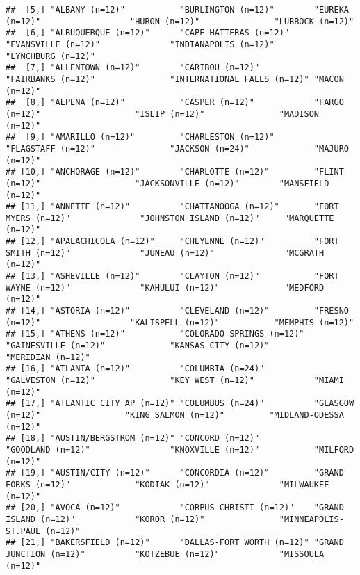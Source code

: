 \documentclass[
]{book}
\begin{document}
\begin{verbatim}
##  [5,] "ALBANY (n=12)"           "BURLINGTON (n=12)"        "EUREKA (n=12)"                  "HURON (n=12)"               "LUBBOCK (n=12)"                
##  [6,] "ALBUQUERQUE (n=12)"      "CAPE HATTERAS (n=12)"     "EVANSVILLE (n=12)"              "INDIANAPOLIS (n=12)"        "LYNCHBURG (n=12)"              
##  [7,] "ALLENTOWN (n=12)"        "CARIBOU (n=12)"           "FAIRBANKS (n=12)"               "INTERNATIONAL FALLS (n=12)" "MACON (n=12)"                  
##  [8,] "ALPENA (n=12)"           "CASPER (n=12)"            "FARGO (n=12)"                   "ISLIP (n=12)"               "MADISON (n=12)"                
##  [9,] "AMARILLO (n=12)"         "CHARLESTON (n=12)"        "FLAGSTAFF (n=12)"               "JACKSON (n=24)"             "MAJURO (n=12)"                 
## [10,] "ANCHORAGE (n=12)"        "CHARLOTTE (n=12)"         "FLINT (n=12)"                   "JACKSONVILLE (n=12)"        "MANSFIELD (n=12)"              
## [11,] "ANNETTE (n=12)"          "CHATTANOOGA (n=12)"       "FORT MYERS (n=12)"              "JOHNSTON ISLAND (n=12)"     "MARQUETTE (n=12)"              
## [12,] "APALACHICOLA (n=12)"     "CHEYENNE (n=12)"          "FORT SMITH (n=12)"              "JUNEAU (n=12)"              "MCGRATH (n=12)"                
## [13,] "ASHEVILLE (n=12)"        "CLAYTON (n=12)"           "FORT WAYNE (n=12)"              "KAHULUI (n=12)"             "MEDFORD (n=12)"                
## [14,] "ASTORIA (n=12)"          "CLEVELAND (n=12)"         "FRESNO (n=12)"                  "KALISPELL (n=12)"           "MEMPHIS (n=12)"                
## [15,] "ATHENS (n=12)"           "COLORADO SPRINGS (n=12)"  "GAINESVILLE (n=12)"             "KANSAS CITY (n=12)"         "MERIDIAN (n=12)"               
## [16,] "ATLANTA (n=12)"          "COLUMBIA (n=24)"          "GALVESTON (n=12)"               "KEY WEST (n=12)"            "MIAMI (n=12)"                  
## [17,] "ATLANTIC CITY AP (n=12)" "COLUMBUS (n=24)"          "GLASGOW (n=12)"                 "KING SALMON (n=12)"         "MIDLAND-ODESSA (n=12)"         
## [18,] "AUSTIN/BERGSTROM (n=12)" "CONCORD (n=12)"           "GOODLAND (n=12)"                "KNOXVILLE (n=12)"           "MILFORD (n=12)"                
## [19,] "AUSTIN/CITY (n=12)"      "CONCORDIA (n=12)"         "GRAND FORKS (n=12)"             "KODIAK (n=12)"              "MILWAUKEE (n=12)"              
## [20,] "AVOCA (n=12)"            "CORPUS CHRISTI (n=12)"    "GRAND ISLAND (n=12)"            "KOROR (n=12)"               "MINNEAPOLIS-ST.PAUL (n=12)"    
## [21,] "BAKERSFIELD (n=12)"      "DALLAS-FORT WORTH (n=12)" "GRAND JUNCTION (n=12)"          "KOTZEBUE (n=12)"            "MISSOULA (n=12)"               

\end{verbatim}
\end{document}
